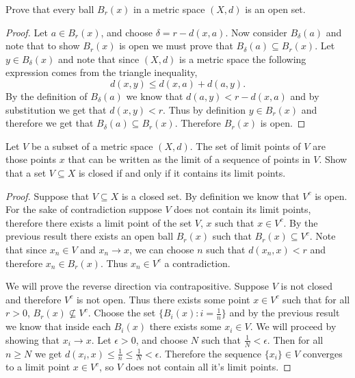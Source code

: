 \documentclass[minion]{homework651}
\begin{document}
\begin{problems}

\problem Prove that every ball $B_r(x)$ in a metric space $(X, d)$ is an open set. 
\solution
\begin{proof}
    Let $a \in B_r(x)$, and choose $\delta = r - d(x, a)$. Now consider $B_{\delta}(a)$ and note that to show $B_r(x)$ is open we must prove that $B_{\delta}(a) \subseteq B_r(x)$.
    Let $y \in B_{\delta}(x)$ and note that since $(X, d)$ is a metric space the following expression comes from the triangle inequality, 
    \begin{equation*}
        d(x, y) \leq d(x, a) + d(a, y).
    \end{equation*}
    By the definition of $B_{\delta}(a)$ we know that $d(a, y) < r - d(x, a)$ and by substitution we get that $d(x, y) < r$. Thus by definition 
    $y \in B_r(x)$ and therefore we get that $B_{\delta}(a) \subseteq B_r(x)$. Therefore $B_r(x)$ is open.
    
\end{proof}


\problem Let $V$ be a subset of a metric space $(X, d)$. The set of limit points of $V$ are those points 
$x$ that can be written as the limit of a sequence of points in $V$. Show that a set $V \subseteq X$ is closed if and 
only if it contains its limit points. 
\solution 
\begin{proof} Suppose that $V \subseteq X$ is a closed set. By definition we know that $V^c$ is open. For the sake of contradiction suppose $V$ does not 
    contain its limit points, therefore there exists a limit point of the set $V$, $x$ such that $x \in V^c$. By the previous result there exists an open ball 
    $B_r(x)$ such that $B_r(x) \subseteq V^c$. Note that since ${x_n} \in V$ and $x_n \to x$, we can choose $n$ such that $d(x_n, x) < r$ and therefore $x_n \in B_r(x)$. 
    Thus $x_n \in V^c$ a contradiction. 
    
    We will prove the reverse direction via contrapositive. Suppose $V$ is not closed and therefore $V^c$ is not open.
    Thus there exists some point $x \in V^c$ such that for all $r > 0$, $B_r(x) \not \subseteq V^c$. Choose the set $\{B_i(x): i = \frac{1}{n}\}$ and by the previous 
    result we know that inside each $B_i(x)$ there exists some $x_i \in V$. We will proceed by showing that $x_i \to x$. Let $\epsilon > 0$, and choose $N$ such that $\frac{1}{N} < \epsilon$. Then for all $n \geq N$ we get $d(x_i, x) \leq \frac{1}{n} \leq \frac{1}{N} < \epsilon$. Therefore the sequence $\{x_i\} \in V$ converges to a limit point $x \in V^c$,
    so $V$ does not contain all it's limit points.
\end{proof}



\end{problems}
\end{document}
